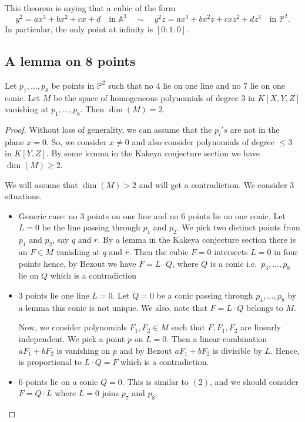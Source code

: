 \documentclass[12pt, a4paper]{article}
\renewcommand{\AA}{\mathbb A}
\newcommand{\PP}{\mathbb P}
\begin{document}
\begin{mdnote}
    This theorem is saying that a cubic of the form 
    \[y^2 = ax^3+bx^2+cx+d \quad \text{in  \(\AA^3\)} \quad  \sim \quad y^2z=ax^3+bx^2z+cxz^2+dz^3 \quad \text{in \(\PP^2\)}.\]
    In particular, the only point at infinity is \([0:1:0]\).
\end{mdnote}

\subsection{A lemma on 8 points}

\begin{mdthm}
    Let \(p_1,\ldots,p_8\) be points in \(\PP^2\) such that no \(4\) lie on one line and no \(7\) lie on one conic. Let \(M\) be the space of homogeneous polynomials of degree \(3\) in \(K[X,Y,Z]\) vanishing at \(p_1,\ldots,p_8\). Then \(\dim(M)=2\). 
\end{mdthm}

\begin{proof}
    Without loss of generality, we can assume that the \(p_i's\) are not in the plane \(x=0\). So, we consider \(x\neq 0\) and also consider polynomials of degree \( \leq 3\) in \(K[Y,Z]\). By some lemma in the Kakeya conjecture section we have \(\dim(M)\geq 2\). 
    
    We will assume that \(\dim(M)>2\) and will get a contradiction. We consider \(3\) situations.
    \begin{itemize}
        \item Generic case: no \(3\) points on one line and no \(6\) points lie on one conic. Let \(L=0\) be the line passing through \(p_1\) and \(p_2\). We pick two distinct points from \(p_1\) and \(p_2\), say \(q\) and \(r\). By a lemma in the Kakeya conjecture section there is an \(F \in M\) vanishing at \(q\) and \(r\). Then the cubic \(F=0\) intersects \(L=0\) in four points hence, by Bezout we have \(F= L\cdot Q\), where \(Q\) is a conic i.e.\ \(p_3,\ldots,p_8\) lie on \(Q\) which is a contradiction

        \item \(3\) points  lie one line \(L=0\). Let \(Q=0\) be a conic passing through \(p_4,\ldots, p_8\) by a lemma this conic is not unique. We also, note that \(F =L\cdot Q\) belongs to \(M\).  
        
        Now, we consider polynomials \(F_1,F_2\in M\) such that \(F,F_1,F_2\) are linearly independent. We pick a point \(p\) on \(L=0\). Then a linear combination \(aF_1+bF_2\) is vanishing on \(p\) and by Bezout \(aF_1+bF_2\) is divisible by \(L\). Hence, is proportional to \(L \cdot Q=F\) which is a contradiction.
        \item \(6\) points lie on a conic \(Q=0\). This is similar to \((2)\), and we should consider \(F= Q\cdot L\) where \(L=0\) joins \(p_7\) and \(p_8\).
    \end{itemize}
\end{proof}
\end{document}

